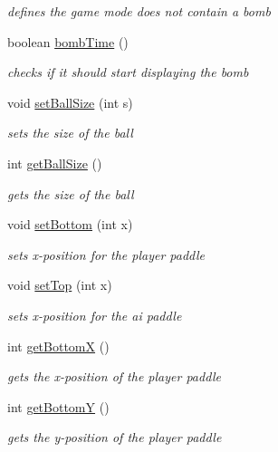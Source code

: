 \begin{DoxyCompactItemize}
\begin{DoxyCompactList}\small\item\em defines the game mode does not contain a bomb \end{DoxyCompactList}\item 
boolean \hyperlink{classview_1_1_pong_game_display_a655e0b247af65aa672e233c321488750}{bomb\+Time} ()
\begin{DoxyCompactList}\small\item\em checks if it should start displaying the bomb \end{DoxyCompactList}\item 
void \hyperlink{classview_1_1_pong_game_display_a295d4a14e718454eb223a5bb06141d53}{set\+Ball\+Size} (int s)
\begin{DoxyCompactList}\small\item\em sets the size of the ball \end{DoxyCompactList}\item 
int \hyperlink{classview_1_1_pong_game_display_a877f192e2651263a9f6ffec587dd8e80}{get\+Ball\+Size} ()
\begin{DoxyCompactList}\small\item\em gets the size of the ball \end{DoxyCompactList}\item 
void \hyperlink{classview_1_1_pong_game_display_aeaaff1c8033efd2d7f3242ab3b6c7e9e}{set\+Bottom} (int x)
\begin{DoxyCompactList}\small\item\em sets x-\/position for the player paddle \end{DoxyCompactList}\item 
void \hyperlink{classview_1_1_pong_game_display_a8b9caa56b471453556b7380ee6d37340}{set\+Top} (int x)
\begin{DoxyCompactList}\small\item\em sets x-\/position for the ai paddle \end{DoxyCompactList}\item 
int \hyperlink{classview_1_1_pong_game_display_ab5d2d9429f7d666fea097c2ea3118893}{get\+BottomX} ()
\begin{DoxyCompactList}\small\item\em gets the x-\/position of the player paddle \end{DoxyCompactList}\item 
int \hyperlink{classview_1_1_pong_game_display_afa4d22c9959dc02057a1b56fef3f33cd}{get\+BottomY} ()
\begin{DoxyCompactList}\small\item\em gets the y-\/position of the player paddle \end{DoxyCompactList}\item 

\end{DoxyCompactItemize}
